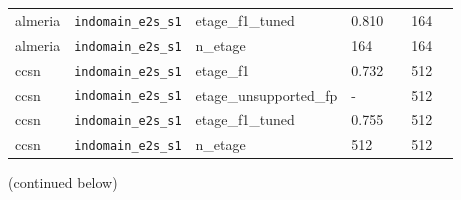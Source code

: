 \begin{center}
{\begin{tabular}{lllllll}
almeria & \texttt{indomain\_\allowbreak{}e2s\_\allowbreak{}s1} & etage\_f1\_tuned & 0.810 &  & 164 &  \\
almeria & \texttt{indomain\_\allowbreak{}e2s\_\allowbreak{}s1} & n\_etage & 164 &  & 164 &  \\
ccsn & \texttt{indomain\_\allowbreak{}e2s\_\allowbreak{}s1} & etage\_f1 & 0.732 &  & 512 &  \\
ccsn & \texttt{indomain\_\allowbreak{}e2s\_\allowbreak{}s1} & etage\_unsupported\_fp & - &  & 512 &  \\
ccsn & \texttt{indomain\_\allowbreak{}e2s\_\allowbreak{}s1} & etage\_f1\_tuned & 0.755 &  & 512 &  \\
ccsn & \texttt{indomain\_\allowbreak{}e2s\_\allowbreak{}s1} & n\_etage & 512 &  & 512 &  \\
\bottomrule
\end{tabular}}\par\footnotesize(continued below)
\end{center}

